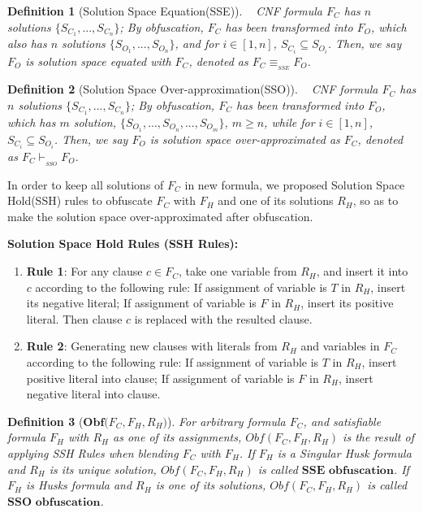 \documentclass[conference,compsocconf]{IEEEtran}
\newtheorem{definition}{\textbf{Definition}}
\begin{document}
\begin{definition}[Solution Space Equation(SSE)]\label{SSEdefinition}~
CNF formula $F_C$ has $n$ solutions $\{S_{C_1},...,S_{C_n}\}$;
By obfuscation,
$F_C$ has been transformed into $F_O$,
which also has $n$ solutions $\{S_{O_1},...,S_{O_n}\}$,
and for $i \in [1,n]$, $S_{C_i} \subseteq S_{O_i}$.
Then, we say $F_O$ is solution space equated with $F_C$, 
denoted as  $F_C \equiv_{_{SSE}} F_O$.
\end{definition}

\begin{definition}[Solution Space Over-approximation(SSO)]\label{SSOdefinition}~
CNF formula $F_C$ has $n$ solutions $\{S_{C_1},...,S_{C_n}\}$;
By obfuscation,
$F_C$ has been transformed into $F_O$,
which has $m$ solution, $\{S_{O_1},...,S_{O_n},...,S_{O_m}\}$,
$m \geqslant n$,
while for $i \in [1,n]$, $S_{C_i} \subseteq S_{O_i}$.
Then, we say $F_O$ is solution space over-approximated as $F_C$, 
 denoted as $F_C \vdash_{_{SSO}} F_O$.
\end{definition}

In order to keep all solutions of $F_C$ in new formula,
we proposed Solution Space Hold(SSH) rules to obfuscate $F_C$ with $F_H$ and one of its solutions $R_H$,
so as to make the solution space over-approximated after obfuscation.

\textbf{Solution Space Hold Rules (SSH Rules): }
\begin{enumerate}
\item \textbf{Rule 1}:
For any clause $c\in F_{C}$, 
take one variable from $R_H$, 
and insert it into $c$ according to the following rule:
If assignment of variable is $T$ in $R_H$, insert its negative literal;
If assignment of variable is $F$ in $R_H$, insert its positive literal.
Then clause $c$ is replaced with the resulted clause.
\item \textbf{Rule 2}:
Generating new clauses with literals from $R_H$ and variables in $F_C$ according to the following rule:
If assignment of variable is $T$ in $R_H$, insert positive literal into clause;
If assignment of variable is $F$ in $R_H$, insert negative literal into clause.
\end{enumerate}

\begin{definition}[${\textbf{Obf(}}F_C,F_H,R_H\textbf{)}$]\label{OBFUSCATORSSH}
For arbitrary formula $F_C$, and satisfiable formula $F_H$ with $R_H$ as one of its assignments, 
$Obf(F_C,F_H,R_H)$ is the result of applying SSH Rules when blending $F_C$ with $F_H$.
If $F_H$ is a Singular Husk formula and $R_H$ is its unique solution, $Obf(F_C,F_H,R_H)$ is called ${\textbf{SSE obfuscation}}$.
If $F_H$ is Husks formula and $R_H$ is one of its solutions, $Obf(F_C,F_H,R_H)$ is called ${\textbf{SSO obfuscation}}$.
\end{definition}
\end{document}
